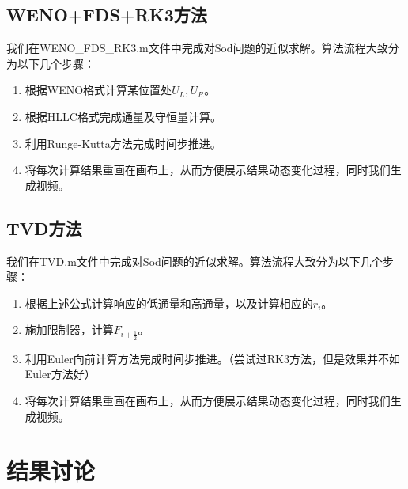 \documentclass[12pt,a4paper]{article}%
\begin{document}
		\subsection{WENO+FDS+RK3方法}
		我们在WENO\_FDS\_RK3.m文件中完成对Sod问题的近似求解。算法流程大致分为以下几个步骤：
		\begin{enumerate}
			\item 根据WENO格式计算某位置处$U_L,U_R$。
			\item 根据HLLC格式完成通量及守恒量计算。
			\item 利用Runge-Kutta方法完成时间步推进。
			\item 将每次计算结果重画在画布上，从而方便展示结果动态变化过程，同时我们生成视频。
		\end{enumerate}
		
		\subsection{TVD方法}
		我们在TVD.m文件中完成对Sod问题的近似求解。算法流程大致分为以下几个步骤：
		\begin{enumerate}
			\item 根据上述公式计算响应的低通量和高通量，以及计算相应的$r_i$。
			\item 施加限制器，计算$F_{i+\frac12}$。
			\item 利用Euler向前计算方法完成时间步推进。（尝试过RK3方法，但是效果并不如Euler方法好）
			\item 将每次计算结果重画在画布上，从而方便展示结果动态变化过程，同时我们生成视频。
		\end{enumerate}

	\section{结果讨论}
\end{document}
